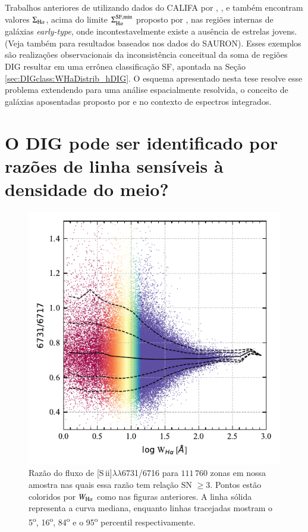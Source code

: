 Trabalhos anteriores de utilizando dados do CALIFA por \citet{Kehrig.etal.2012}, \citet{Singh.etal.2013}, e \citet{Gomes.etal.2016b} também encontram valores $\Sigma_{\Ha}$, acima do limite $\Sigma^{\rm SF,min}_{\Ha}$ proposto por \citet{Zhang.etal.2017a}, nas regiões internas de galáxias {\em early-type}, onde incontestavelmente existe a ausência de estrelas jovens. (Veja também \citealt{Sarzi.etal.2010} para resultados baseados nos dados do SAURON). Esses exemplos são realizações observacionais da inconsistência conceitual da soma de regiões DIG resultar em uma errônea classificação SF, apontada na Seção \ref{sec:DIGclass:WHaDistrib_hDIG}. O esquema apresentado nesta tese resolve esse problema extendendo para uma análise espacialmente resolvida, o conceito de galáxias aposentadas proposto por \citet{Stasinska.etal.2008a} e \citet{CidFernandes.etal.2011a} no contexto de espectros integrados.


\section{O DIG pode ser identificado por razões de linha sensíveis à densidade do meio?}
\label{sec:DIGdisc:nSii}

\begin{figure}
 \includegraphics{figuras/fig_SII_logWHa_SNR3.pdf}
 \caption[$\log$ \sii$\times \log W_{{\rm H}\alpha}$]
 {Razão do fluxo de [S\,{\sc ii}]$\lambda\lambda$6731/6716 para $111\,760$ zonas em nossa amostra nas quais essa razão tem relação SN $\ge 3$. Pontos estão coloridos por $W_{\Ha}$ como nas figuras anteriores. A linha sólida representa a curva mediana, enquanto linhas tracejadas mostram o 5\textsuperscript{o}, 16\textsuperscript{o}, 84\textsuperscript{o} e o 95\textsuperscript{o} percentil respectivamente.}
 \label{fig:S2_WHa}
\end{figure}

